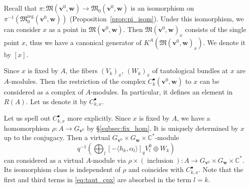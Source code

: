 \documentclass[12pt]{amsart}
\def\Bbb{\mathbb}
\def\frak{\mathfrak}
\theoremstyle{definition}
\theoremstyle{remark}
\numberwithin{equation}{subsection}
\newcommand{\propref}[1]{Proposition~\ref{#1}}
\newcommand{\subsecref}[1]{\S\ref{#1}}
\newcommand{\C}{{\Bbb C}}
\newcommand{\M}{{\frak M}} %
\newcommand{\Mreg}{{\frak M_0^{\operatorname{reg}}}}
\newcommand{\bv}{{\mathbf v}} %
\newcommand{\bw}{{\mathbf w}} %
\begin{document}
Recall that $\pi\colon \M(\bv^0,\bw) \to \M_0(\bv^0,\bw)$ is an
isomorphism on $\pi^{-1}(\Mreg(\bv^0,\bw))$ (\propref{prop:pi_isom}).
Under this isomorphism, we can consider $x$ as a point in
$\M(\bv^0,\bw)$.  Then $\M(\bv^0,\bw)_x$ consists of the single point
$x$, thus we have a canonical generator of $K^A(\M(\bv^0,\bw)_x)$.  We
denote it by $[x]$.

Since $x$ is fixed by $A$, the fibers $(V_k)_x$, $(W_k)_x$ of tautological 
bundles at $x$ are $A$-modules. Then the restriction of the complex
$C_k^\bullet(\bv^0,\bw)$ to $x$ can be considered as a complex of
$A$-modules. In particular, it defines an element in $R(A)$.
Let us denote it by $C_{k,x}^\bullet$.

Let us spell out $C_{k,x}^\bullet$ more explicitly.
Since $x$ is fixed by $A$, we have a homomorphism $\rho\colon A\to
G_{\bv^0}$ by \subsecref{subsec:fix_hom}. It is uniquely determined by
$x$ up to the conjugacy. Then a virtual $G_{\bv^0}\times G_\bw\times
\C^*$-module
\begin{equation*}
  q^{-1} \left( \displaystyle{\bigoplus_{l}}
     [-\langle h_k,\alpha_l\rangle]_q V_l^0 \oplus W_k\right)
\end{equation*}
can considered as a virtual $A$-module via
$\rho\times(\operatorname{inclusion})\colon A\to G_{\bv^0}\times
G_\bw\times \C^*$. Its isomorphism class is independent of $\rho$ and
coincides with $C_{k,x}^\bullet$. Note that the first and third terms
in \eqref{eq:taut_cpx} are absorbed in the term $l = k$.
\end{document}
